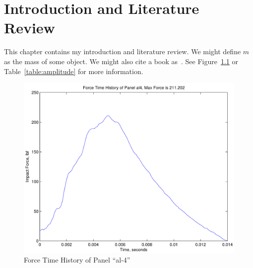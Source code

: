 \chapter{Introduction and Literature Review}

This chapter contains my introduction and literature review. We might define
$m$ as the mass of some object. We might also cite a
book as~\cite{lacava1992}. See Figure~\ref{fig:panel-al4} or
Table~\ref{table:amplitude} for more information.
\begin{figure}[tbp]
\centering
\includegraphics[width=\textwidth]{al4-1}
\caption{Force Time History of Panel ``al-4''\label{fig:panel-al4}}
\end{figure}
